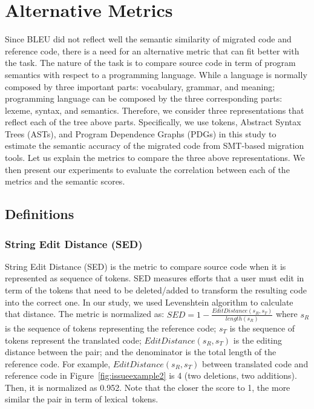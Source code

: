\section{Alternative Metrics}
\label{sec:alternatives}

Since BLEU did not reflect well the semantic similarity of migrated
code and reference code, there is a need for an alternative metric
that can fit better with the task. The nature of the task is to
compare source code in term of program semantics with respect to a
programming language.
%
While a language is normally composed by three important parts:
vocabulary, grammar, and meaning; programming language can be composed
by the three corresponding parts: lexeme, syntax, and
semantics. 
%
Therefore, we consider three representations that reflect each of the
tree above parts. Specifically, we use tokens, Abstract Syntax Trees
(ASTs), and Program Dependence Graphs (PDGs) in this study to estimate
the semantic accuracy of the migrated code from SMT-based migration
tools.
%
Let us explain the metrics to compare the three above representations.
%
We then present our experiments to evaluate the correlation between
each of the metrics and the semantic scores.


\subsection{Definitions}

\subsubsection{\textbf{String Edit Distance (SED)}}
String Edit Distance (SED) is the metric to compare source code when
it is represented as sequence of tokens. SED measures efforts that a
user must edit in term of the tokens that need to be deleted/added to
transform the resulting code into the correct one. In our study, we
used Levenshtein algorithm to calculate that distance. The metric is
normalized as: $SED = 1 - \frac{EditDistance\left(s_R,
  s_T\right)}{length\left(s_R\right)}$ where $s_R$ is the sequence of
tokens representing the reference code; $s_T$ is the sequence of
tokens represent the translated code; $EditDistance\left(s_R,
s_T\right)$ is the editing distance between the pair; and the
denominator is the total length of the reference code. For example,
$EditDistance\left(s_R, s_T\right)$ between translated code and
reference code in Figure~\ref{fig:issueexample2} is 4 (two deletions,
two additions). Then, it is normalized as 0.952. Note that the closer
the score to 1, the more similar the pair in term of lexical~tokens.




 


